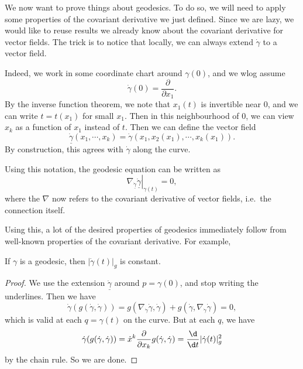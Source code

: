 \documentclass[a4paper]{article}
\begin{document}
We now want to prove things about geodesics. To do so, we will need to apply some properties of the covariant derivative we just defined. Since we are lazy, we would like to reuse results we already know about the covariant derivative for vector fields. The trick is to notice that locally, we can always extend $\dot{\gamma}$ to a vector field.

Indeed, we work in some coordinate chart around $\gamma(0)$, and we wlog assume
\[
  \dot{\gamma}(0) = \frac{\partial}{\partial x_1}.
\]
By the inverse function theorem, we note that $x_1(t)$ is invertible near $0$, and we can write $t = t(x_1)$ for small $x_1$. Then in this neighbourhood of $0$, we can view $x_k$ as a function of $x_1$ instead of $t$. Then we can define the vector field
\[
  \dot{\underline{\gamma}}(x_1, \cdots, x_k) = \dot{\gamma}(x_1, x_2(x_1), \cdots, x_k(x_1)).
\]
By construction, this agrees with $\dot{\gamma}$ along the curve.

Using this notation, the geodesic equation can be written as
\[
  \left.\nabla_{\dot{\underline{\gamma}}} \dot{\underline{\gamma}}\right|_{\gamma(t)} = 0,
\]
where the $\nabla$ now refers to the covariant derivative of vector fields, i.e.\ the connection itself.
\begin{center}
\end{center} %
Using this, a lot of the desired properties of geodesics immediately follow from well-known properties of the covariant derivative. For example,
\begin{prop}
  If $\gamma$ is a geodesic, then $|\dot{\gamma}(t)|_g$ is constant.
\end{prop}

\begin{proof}
  We use the extension $\dot{\underline{\gamma}}$ around $p = \gamma(0)$, and stop writing the underlines. Then we have
  \[
    \dot{\gamma}(g(\dot{\gamma}, \dot{\gamma})) = g(\nabla_{\dot{\gamma}} \dot{\gamma}, \dot{\gamma})+ g(\dot{\gamma}, \nabla_{\dot{\gamma}} \dot{\gamma}) = 0,
  \]
  which is valid at each $q = \gamma(t)$ on the curve. But at each $q$, we have
  \[
    \dot{\gamma}(g(\dot{\gamma}, \dot{\gamma})) = \dot{x}^k \frac{\partial}{\partial x_k} g(\dot{\gamma}, \dot{\gamma}) = \frac{\d}{\d t} |\dot{\gamma}(t)|_g^2
  \]
  by the chain rule. So we are done.
\end{proof}
\end{document}
